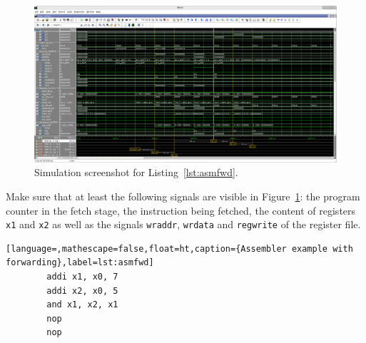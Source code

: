 \begin{figure}[ht!]
  \centering
  	\includegraphics[width=1.0\linewidth]{img/forwarding.png}
  \caption{Simulation screenshot for Listing~\ref{lst:asmfwd}.}
  \label{fig:sim1}
\end{figure}

Make sure that at least the following signals are visible in
Figure~\ref{fig:sim1}: the program counter in the fetch stage, the
instruction being fetched, the content of registers \texttt{x1} 
and \texttt{x2} as well as the signals \texttt{wraddr},
\texttt{wrdata} and \texttt{regwrite} of the register file.

\begin{lstlisting}[language=,mathescape=false,float=ht,caption={Assembler example with forwarding},label=lst:asmfwd]
        addi x1, x0, 7
        addi x2, x0, 5
        and x1, x2, x1
        nop
        nop
\end{lstlisting}

